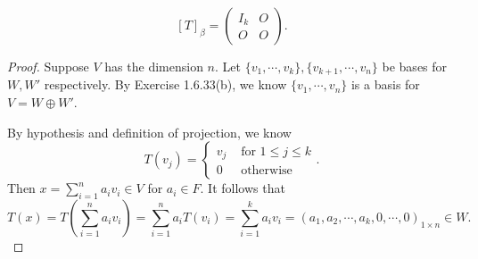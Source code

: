 \begin{Exercise}
	\begin{answer}
		$$
		[T]_{\beta} = \begin{pmatrix}
		I_k & O \\
		O & O 
		\end{pmatrix}.
		$$
	\end{answer}
	\begin{proof}
		Suppose $V$ has the dimension $n$. Let $\{v_1,\cdots,v_k\}, \{v_{k+1},\cdots,v_n\}$ be bases for $W,W'$ respectively. By Exercise 1.6.33(b), we know $\{v_1,\cdots,v_n\}$ is a basis for $V=W\oplus W'$.
		
		By hypothesis and definition of projection, we know
		$$
		T(v_j) = \begin{cases}
		v_j & \mbox{ for } 1\leq j \leq k \\
		0 & \mbox{ otherwise}
		\end{cases}.
		$$
		Then $x = \sum_{i=1}^{n} a_i v_i \in V$ for $a_i\in F$. It follows that
		$$
		T(x) = T\left(\sum_{i=1}^{n}a_i v_i\right) 
		= \sum_{i=1}^{n}a_i T(v_i)
		= \sum_{i=1}^{k}a_i v_i
		= (a_1, a_2, \cdots, a_k, 0, \cdots, 0)_{1\times n} \in W.
		$$
	\end{proof}
\end{Exercise}